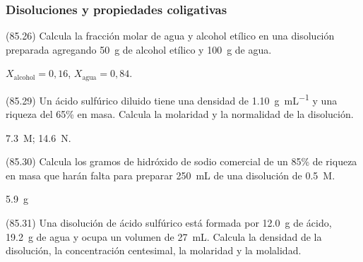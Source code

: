   \subsubsection*{Disoluciones y propiedades coligativas}
  \begin{exercise}[
      tags    = {},
      topics  = {química,química básica},
      source  = {FQ 1B MGH 2016, p85, e26},
    ]
    (85.26) Calcula la fracción molar de agua y alcohol etílico en una
    disolución preparada agregando \SI{50}{\gram} de alcohol etílico y \SI{100}{\gram} de agua.
  \end{exercise}

  \begin{solution}
    \( X_\textrm{alcohol} = 0,16 \), \( X_\textrm{agua} = 0,84 \).
  \end{solution}




  \begin{exercise}[
      tags    = {},
      topics  = {química,química básica},
      source  = {FQ 1B MGH 2016, p85, e29},
    ]
    (85.29) Un ácido sulfúrico diluido tiene una densidad de \SI{1.10}{\gram\per\milli\liter} y una riqueza del 65\% en masa. Calcula la molaridad y la normalidad de la disolución.
  \end{exercise}

  \begin{solution}
    \SI{7.3}{M}; \SI{14.6}{N}.
  \end{solution}




  \begin{exercise}[
      tags    = {},
      topics  = {química,química básica},
      source  = {FQ 1B MGH 2016, p85, e30},
    ]
    (85.30) Calcula los gramos de hidróxido de sodio comercial de un
    85\% de riqueza en masa que harán falta para preparar \SI{250}{\milli\liter} de una disolución de  \SI{0.5}{M}.
  \end{exercise}

  \begin{solution}
    \SI{5.9}{\gram}
  \end{solution}




  \begin{exercise}[
      tags    = {},
      topics  = {química,química básica},
      source  = {FQ 1B MGH 2016, p85, e31},
    ]
    (85.31) Una disolución de ácido sulfúrico está formada por \SI{12.0}{\gram} de
    ácido, \SI{19.2}{\gram} de agua y ocupa un volumen de \SI{27}{\milli\liter}. Calcula la densidad de la disolución, la concentración centesimal, la molaridad y la molalidad.
  \end{exercise}

